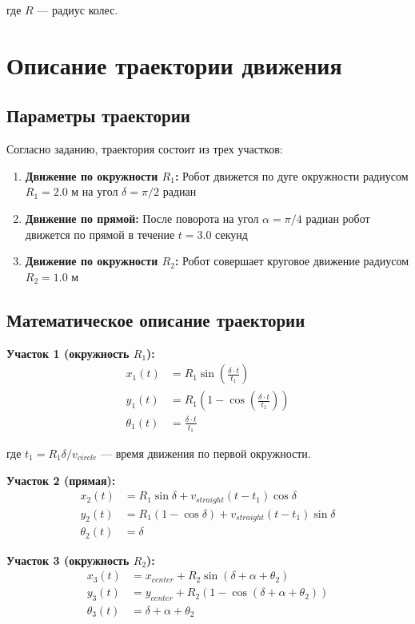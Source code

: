 где $R$ --- радиус колес.

\section{Описание траектории движения}

\subsection{Параметры траектории}

Согласно заданию, траектория состоит из трех участков:

\begin{enumerate}
\item \textbf{Движение по окружности $R_1$:} Робот движется по дуге окружности радиусом $R_1 = 2.0$ м на угол $\delta = \pi/2$ радиан
\item \textbf{Движение по прямой:} После поворота на угол $\alpha = \pi/4$ радиан робот движется по прямой в течение $t = 3.0$ секунд
\item \textbf{Движение по окружности $R_2$:} Робот совершает круговое движение радиусом $R_2 = 1.0$ м
\end{enumerate}

\subsection{Математическое описание траектории}

\textbf{Участок 1 (окружность $R_1$):}
\begin{align}
x_1(t) &= R_1 \sin\left(\frac{\delta \cdot t}{t_1}\right) \\
y_1(t) &= R_1 \left(1 - \cos\left(\frac{\delta \cdot t}{t_1}\right)\right) \\
\theta_1(t) &= \frac{\delta \cdot t}{t_1}
\end{align}

где $t_1 = R_1 \delta / v_{circle}$ --- время движения по первой окружности.

\textbf{Участок 2 (прямая):}
\begin{align}
x_2(t) &= R_1 \sin\delta + v_{straight}(t - t_1)\cos\delta \\
y_2(t) &= R_1(1 - \cos\delta) + v_{straight}(t - t_1)\sin\delta \\
\theta_2(t) &= \delta
\end{align}

\textbf{Участок 3 (окружность $R_2$):}
\begin{align}
x_3(t) &= x_{center} + R_2 \sin(\delta + \alpha + \theta_2) \\
y_3(t) &= y_{center} + R_2(1 - \cos(\delta + \alpha + \theta_2)) \\
\theta_3(t) &= \delta + \alpha + \theta_2
\end{align}

